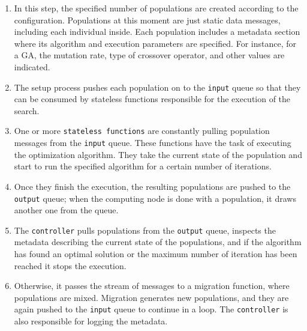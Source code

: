 \begin{enumerate}

\item In this step, the specified number of populations are created according
to the configuration. Populations at this moment are just static data messages,
including each individual inside. Each population includes a metadata section
where its algorithm and execution parameters are specified. For instance, for a
GA, the mutation rate, type of crossover operator, and other values are
indicated.

\item The setup process pushes each population on to the \texttt{input}
queue so that they can be consumed by stateless functions responsible for the
execution of the search.

\item One or more \texttt{stateless functions} are constantly pulling
population messages from the \texttt{input} queue. These functions have the
task of executing the optimization algorithm. They take the current state of
the population and start to run the specified algorithm for a certain number of
iterations.

\item Once they finish the execution, the resulting populations are pushed to
the \texttt{output} queue; when the computing node is done with a population, it draws another one from the
queue.

\item The \texttt{controller} pulls populations from the \texttt{output} queue,
inspects the metadata describing the current state of the populations, and if
the algorithm has found an optimal solution or the maximum number of iteration
has been reached it stops the execution.

\item Otherwise, it passes the stream of messages to a migration function,
where populations are mixed. Migration generates new populations, and they are
again pushed to the \texttt{input} queue to continue in a loop. The
\texttt{controller} is also responsible for logging the metadata.

\end{enumerate}

